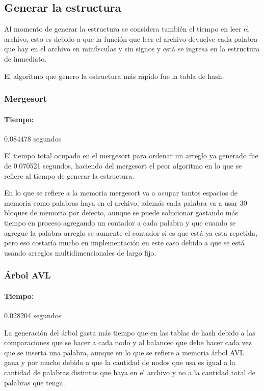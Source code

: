 \documentclass[12pt,letterpaper]{scrartcl}
\begin{document}
\subsection{Generar la estructura}

Al momento de generar la estructura se considera también el tiempo en leer el archivo, esto es debido a que la función que leer el archivo devuelve cada palabra que hay en el archivo en minúsculas y sin signos y está se ingresa en la estructura de inmediato.

El algoritmo que genero la estructura más rápido fue la tabla de hash.

\subsubsection{Mergesort}

\paragraph{Tiempo:} 0.084478 segundos

El tiempo total ocupado en el mergesort para ordenar un arreglo ya generado fue de 0.070521 segundos, haciendo del mergesort el peor algoritmo en lo que se refiere al tiempo de generar la estructura.

En lo que se refiere a la memoria mergesort va a ocupar tantos espacios de memoria como palabras haya en el archivo, además cada palabra va a usar 30 bloques de memoria por defecto, aunque se puede solucionar gastando más tiempo en proceso agregando un contador a cada palabra y que cuando se agregue la palabra arreglo se aumente el contador si es que está ya esta repetida, pero eso costaría mucho en implementación en este caso debido a que se está usando arreglos multidimencionales de largo fijo.

\subsubsection{Árbol AVL}

\paragraph{Tiempo:} 0.028204 segundos

La generación del árbol gasta más tiempo que en las tablas de hash debido a las comparaciones que se hacer a cada nodo y al balanceo que debe hacer cada vez que se inserta una palabra, aunque en lo que se refiere a memoria árbol AVL gana y por mucho debido a que la cantidad de nodos que usa es igual a la cantidad de palabras distintas que haya en el archivo y no a la cantidad total de palabras que tenga.
\end{document}
